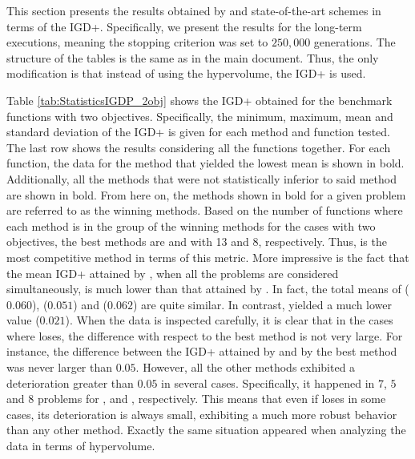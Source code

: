 



This section presents the results obtained by \VSDMOEA{} and state-of-the-art schemes in terms of
the IGD+\cite{Joel:Inverted_Generational_Distance_Plus}.
%
Specifically, we present the results for the long-term executions, meaning
the stopping criterion was set to $250,000$ generations.
%
The structure of the tables is the same as in the main document.
%
Thus, the only modification is that instead of using the hypervolume, the IGD+ is used.

Table \ref{tab:StatisticsIGDP_2obj} shows the IGD+ obtained for the benchmark functions with two objectives.
%
Specifically, the minimum, maximum, mean and standard deviation of the IGD+ is given for each method and function tested.
%
The last row shows the results considering all the functions together.
%
For each function, the data for the method that yielded the lowest mean is shown in bold.
%
Additionally, all the methods that were not statistically inferior to said method are shown in bold.
%
From here on, the methods shown in bold for a given problem are referred to as the winning methods.
%
Based on the number of functions where each method is in the group of the winning methods for the cases 
with two objectives, the best methods are \VSDMOEA{} and \RMOEA{} with 13 and 8, respectively.
%
Thus, \VSDMOEA{} is the most competitive method in terms of this metric.
%
More impressive is the fact that the mean IGD+ attained by \VSDMOEA{}, when all the problems are considered simultaneously, is much lower 
than that attained by \RMOEA{}.
%
In fact, the total means of \RMOEA{} ($0.060$), \NSGAII{} ($0.051$) and \MOEAD{} ($0.062$) are quite similar.
%
In contrast, \VSDMOEA{} yielded a much lower value ($0.021$).
%
When the data is inspected carefully, it is clear that in the cases where \VSDMOEA{} loses, the difference with respect to the
best method is not very large.
%
For instance, the difference between the IGD+ attained by \VSDMOEA{} and by the best method was never larger
than $0.05$.
%
However, all the other methods exhibited a deterioration greater than $0.05$ in several cases.
%
Specifically, it happened in $7$, $5$ and $8$ problems for \MOEAD{}, \NSGAII{} and \RMOEA{}, respectively.
%
This means that even if \VSDMOEA{} loses in some cases, its deterioration is always small, exhibiting a much more 
robust behavior than any other method.
%
Exactly the same situation appeared when analyzing the data in terms of hypervolume.

